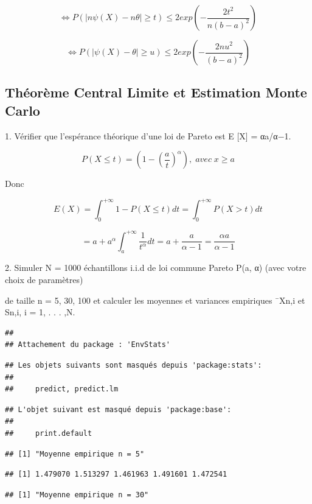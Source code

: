 \documentclass[
]{article}
\begin{document}
\[
\Leftrightarrow 
P(|n\psi(X)-n\theta| \ge t) \le 2exp(-\frac{2t^{2}}{n(b-a)^{2}})
\]

\[
\Leftrightarrow 
P(|\psi(X)-\theta| \ge u) \le 2exp(-\frac{2nu^{2}}{(b-a)^{2}})
\]

\hypertarget{thuxe9oruxe8me-central-limite-et-estimation-monte-carlo}{%
\subsection{Théorème Central Limite et Estimation Monte
Carlo}\label{thuxe9oruxe8me-central-limite-et-estimation-monte-carlo}}

1. Vérifier que l'espérance théorique d'une loi de Pareto est E {[}X{]}
= αa/α−1.

\[
P(X\le t)= (1-\left( \frac{a}{t} \right)^{\alpha}) , \;avec \;x \ge a
\]

Donc

\[
E(X) = \int_{0}^{+\infty}1-P(X\le t)dt = \int_{0}^{+\infty}P(X\gt t)dt
\]

\[
=a+a^{\alpha}\int_{a}^{+\infty}\frac{1}{t^{\alpha}}dt=a + \frac{a}{\alpha -1} =\frac{\alpha a}{\alpha -1}
\]

2. Simuler N = 1000 échantillons i.i.d de loi commune Pareto P(a, α)
(avec votre choix de paramètres)

de taille n = 5, 30, 100 et calculer les moyennes et variances
empiriques ¯Xn,i et Sn,i, i = 1, . . . ,N.

\begin{verbatim}
## 
## Attachement du package : 'EnvStats'
\end{verbatim}

\begin{verbatim}
## Les objets suivants sont masqués depuis 'package:stats':
## 
##     predict, predict.lm
\end{verbatim}

\begin{verbatim}
## L'objet suivant est masqué depuis 'package:base':
## 
##     print.default
\end{verbatim}

\begin{verbatim}
## [1] "Moyenne empirique n = 5"
\end{verbatim}

\begin{verbatim}
## [1] 1.479070 1.513297 1.461963 1.491601 1.472541
\end{verbatim}

\begin{verbatim}
## [1] "Moyenne empirique n = 30"
\end{verbatim}
\end{document}
